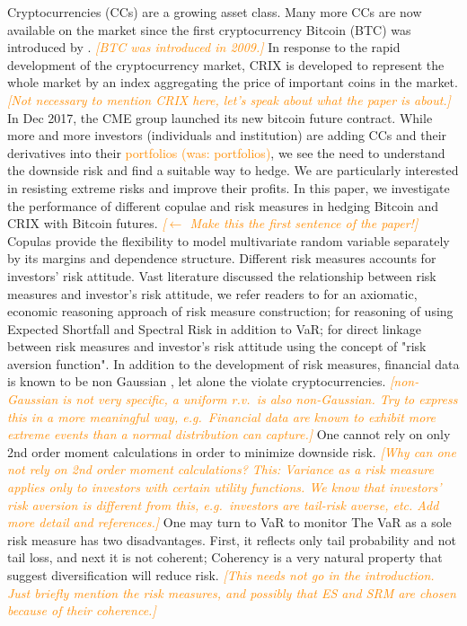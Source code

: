 \documentclass[11pt,a4paper,english]{article}
\providecommand{\natp}[1]{\textcolor{darkorange}{#1}}
\begin{document}
Cryptocurrencies (CCs) are a growing asset class.
Many more CCs are now available on the market since the first
cryptocurrency Bitcoin (BTC) was introduced by
\citet{nakamoto2019bitcoin}. \natp{\em [BTC was introduced in 2009.]}
In response to the rapid development of the cryptocurrency market, CRIX \citep{trimborn2018crix} is developed to represent the whole
market by an index aggregating the price of important coins in the
market. \natp{\em [Not necessary to mention CRIX here, let's speak
  about what the paper is about.]}
In Dec 2017, the CME group launched its new bitcoin future contract.
While more and more investors (individuals and institution) are adding
CCs and their derivatives into their \natp{portfolios (was: portfolios)},
we see the need to understand the downside risk and find a suitable way to hedge.
We are particularly interested in resisting extreme risks and improve their profits.
In this paper, we investigate the performance of different copulae and
risk measures in hedging Bitcoin and CRIX with Bitcoin
futures. \natp{\em [$\leftarrow$ Make this the first sentence of the paper!]}
Copulas provide the flexibility to model multivariate random variable
separately by its margins and dependence structure. 
Different risk measures accounts for investors' risk attitude.
Vast literature discussed the relationship between risk measures and investor's risk attitude, we refer readers to
\citet{artzner1999coherent} for an axiomatic, economic reasoning approach of risk measure construction;
\citet{embrechts2002correlation} for reasoning of using Expected Shortfall and Spectral Risk in addition to VaR;
\citet{Acerbi2002} for direct linkage between risk measures and investor's risk attitude using the concept of "risk aversion function".
In addition to the development of risk measures, financial data is known to be non Gaussian \natp{\cite{Cont2001}}, let
alone the violate cryptocurrencies. \natp{\em [non-Gaussian is not
  very specific, a uniform r.v.\ is also non-Gaussian. Try to express
  this in a more meaningful way, e.g.\ Financial data are known to
  exhibit more extreme events than a normal distribution can capture.]}
One cannot rely on only 2nd order moment calculations in order to
minimize downside risk. \natp{\em [Why can one not rely on 2nd order
  moment calculations? This: Variance as a risk measure applies only
  to investors with certain utility functions. We know that investors'
  risk aversion is different from this, e.g.\ investors are tail-risk
  averse, etc. Add more detail and references.]}
One may turn to VaR to monitor The VaR as a sole risk measure has two disadvantages.
First, it reflects only tail probability and not tail loss, and next it is not coherent;
Coherency is a very natural property that suggest diversification will
reduce risk. \natp{\em [This needs not go in the introduction. Just
  briefly mention the risk measures, and possibly that ES and SRM are
  chosen because of their coherence.]}
\medskip
\end{document}
